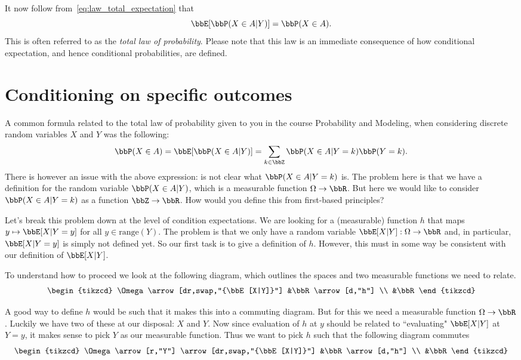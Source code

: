 It now follow from~\eqref{eq:law_total_expectation} that
\[
	\bbE[\bbP(X \in A | Y)] = \bbP(X \in A).
\]
This is often referred to as the \emph{total law of probability}. Please note that this law is an immediate consequence of how conditional expectation, and hence conditional probabilities, are defined.



\section{Conditioning on specific outcomes}

A common formula related to the total law of probability given to you in the course Probability and Modeling, when considering discrete random variables $X$ and $Y$ was the following:
\begin{equation}\label{eq:law_of_probability_discrete}
	\bbP(X \in A) = \bbE[\bbP(X \in A | Y)] = \sum_{k \in \bbZ} \bbP(X \in A | Y= k) \bbP(Y = k). 
\end{equation}
There is however an issue with the above expression: is not clear what $\bbP(X \in A | Y = k)$ is. The problem here is that we have a definition for the random variable $\bbP(X \in A | Y)$, which is a measurable function $\Omega \to \bbR$. But here we would like to consider $\bbP(X \in A | Y = k)$ as a function $\bbZ \to \bbR$. How would you define this from first-based principles?

Let's break this problem down at the level of condition expectations. We are looking for a (measurable) function $h$ that maps $y \mapsto \bbE[X | Y = y]$ for all $y \in \mathrm{range}(Y)$. The problem is that we only have a random variable $\bbE[X |Y] : \Omega \to \bbR$ and, in particular, $\bbE[X | Y = y]$ is simply not defined yet. So our first task is to give a definition of $h$. However, this must in some way be consistent with our definition of $\bbE[X|Y]$.  

To understand how to proceed we look at the following diagram, which outlines the spaces and two measurable functions we need to relate.
\[
\begin{tikzcd}
	\Omega \arrow[dr,swap,"{\bbE[X|Y]}"] &\bbR \arrow[d,"h"]  \\
	&\bbR
\end{tikzcd}
\]

A good way to define $h$ would be such that it makes this into a commuting diagram. But for this we need a measurable function $\Omega \to \bbR$. Luckily we have two of these at our disposal: $X$ and $Y$. Now since evaluation of $h$ at $y$ should be related to ``evaluating" $\bbE[X|Y]$ at $Y = y$, it makes sense to pick $Y$ as our measurable function. Thus we want to pick $h$ such that the following diagram commutes
\[
\begin{tikzcd}
	\Omega \arrow[r,"Y"] \arrow[dr,swap,"{\bbE[X|Y]}"] &\bbR \arrow[d,"h"]  \\
	&\bbR
\end{tikzcd}
\]

